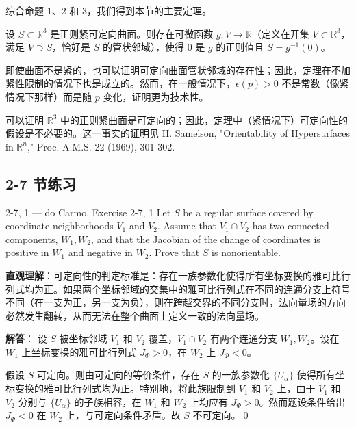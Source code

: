 综合命题 1、2 和 3，我们得到本节的主要定理。

\begin{Theorem}[紧可定向曲面的特征]\label{th:compact-orientable-characterization}
设 $S \subset \mathbb{R}^3$ 是正则紧可定向曲面。则存在可微函数 $g: V \to \mathbb{R}$（定义在开集 $V \subset \mathbb{R}^3$，满足 $V \supset S$，恰好是 $S$ 的管状邻域），使得 0 是 $g$ 的正则值且 $S = g^{-1}(0)$。
\end{Theorem}

\begin{Remark}
即使曲面不是紧的，也可以证明可定向曲面管状邻域的存在性；因此，定理在不加紧性限制的情况下也是成立的。然而，在一般情况下，$\epsilon(p) > 0$ 不是常数（像紧情况下那样）而是随 $p$ 变化，证明更为技术性。
\end{Remark}

\begin{Remark}
可以证明 $\mathbb{R}^3$ 中的正则紧曲面是可定向的；因此，定理中（紧情况下）可定向性的假设是不必要的。这一事实的证明见 H. Samelson, "Orientability of Hypersurfaces in $\mathbb{R}^n$," Proc. A.M.S. 22 (1969), 301-302.
\end{Remark}

\subsection*{2-7 节练习}

\begin{exercise}{2-7, 1 — do Carmo, Exercise 2-7, 1}
Let $S$ be a regular surface covered by coordinate neighborhoods $V_1$ and $V_2$. Assume that $V_1 \cap V_2$ has two connected components, $W_1, W_2$, and that the Jacobian of the change of coordinates is positive in $W_1$ and negative in $W_2$. Prove that $S$ is nonorientable.
\end{exercise}

\begin{solution}
\textbf{直观理解}：可定向性的判定标准是：存在一族参数化使得所有坐标变换的雅可比行列式均为正。如果两个坐标邻域的交集中的雅可比行列式在不同的连通分支上符号不同（在一支为正，另一支为负），则在跨越交界的不同分支时，法向量场的方向必然发生翻转，从而无法在整个曲面上定义一致的法向量场。

\textbf{解答}：
设 $S$ 被坐标邻域 $V_1$ 和 $V_2$ 覆盖，$V_1 \cap V_2$ 有两个连通分支 $W_1, W_2$。设在 $W_1$ 上坐标变换的雅可比行列式 $J_\Phi > 0$，在 $W_2$ 上 $J_\Phi < 0$。

假设 $S$ 可定向。则由可定向的等价条件，存在 $S$ 的一族参数化 $\{U_\alpha\}$ 使得所有坐标变换的雅可比行列式均为正。特别地，将此族限制到 $V_1$ 和 $V_2$ 上，由于 $V_1$ 和 $V_2$ 分别与 $\{U_\alpha\}$ 的子族相容，在 $W_1$ 和 $W_2$ 上均应有 $J_\Phi > 0$。然而题设条件给出 $J_\Phi < 0$ 在 $W_2$ 上，与可定向条件矛盾。故 $S$ 不可定向。\qed
\end{solution}

